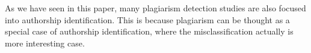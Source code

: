 \documentclass[english]{tktltiki2}
\theoremstyle{definition}
\theoremstyle{remark}
\begin{document}
As we have seen in this paper, many plagiarism detection studies are also focused into authorship identification. This is because plagiarism can be thought as a special case of authorship identification, where the misclassification actually is more interesting case. 


%
%
%
%







% 
\end{document}
